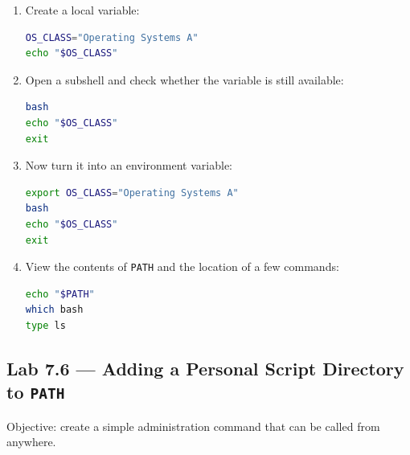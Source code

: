 \begin{enumerate}
  \item Create a local variable:
\begin{lstlisting}[language=bash, caption={Creating a local shell variable}]
OS_CLASS="Operating Systems A"
echo "$OS_CLASS"
\end{lstlisting}

  \item Open a subshell and check whether the variable is still available:
\begin{lstlisting}[language=bash, caption={Testing a local variable in a subshell}]
bash
echo "$OS_CLASS"
exit
\end{lstlisting}

  \item Now turn it into an environment variable:
\begin{lstlisting}[language=bash, caption={Creating an environment variable}]
export OS_CLASS="Operating Systems A"
bash
echo "$OS_CLASS"
exit
\end{lstlisting}

  \item View the contents of \texttt{PATH} and the location of a few commands:
\begin{lstlisting}[language=bash, caption={Viewing PATH and command locations}]
echo "$PATH"
which bash
type ls
\end{lstlisting}
\end{enumerate}

\subsection*{Lab 7.6 --- Adding a Personal Script Directory to \texttt{PATH}}

Objective: create a simple administration command that can be called from
anywhere.

